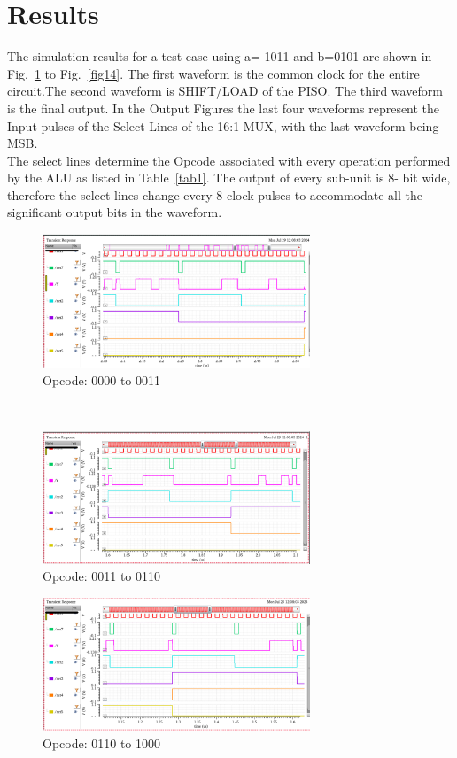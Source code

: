 \documentclass[conference]{IEEEtran}
\begin{document}
\section{Results}\label{E}
The simulation results for a test case using  a=  1011 and b=0101 are shown in Fig.~\ref{fig10} to Fig.~\ref{fig14}. The first waveform is the common clock for the entire circuit.The second waveform is SHIFT/LOAD of the PISO. The third waveform is the final output. In the Output Figures the last four waveforms represent the Input pulses of the Select Lines of the 16:1 MUX, with the last waveform being MSB.\\
The select lines determine the Opcode associated with every operation performed by the ALU as listed in Table~\ref{tab1}. The output of every sub-unit is 8- bit wide, therefore the select lines change every 8 clock pulses to accommodate all the significant output bits in the waveform.
\begin{figure}[htbp]
\centerline{\includegraphics[width=8cm,keepaspectratio,]{"Opcode_0000_0011.png"}}
\caption{Opcode: 0000 to 0011 }
\label{fig10}
\end{figure}\\ 
\begin{figure}[htbp]
\centerline{\includegraphics[width=8cm,keepaspectratio,]{"Opcode_0011_0110.png"}}
\caption{Opcode: 0011 to 0110}
\label{fig11}
\end{figure}
\begin{figure}[htbp]
\centerline{\includegraphics[width=8cm,keepaspectratio,]{"Opcode_0110_1000.png"}}
\caption{Opcode: 0110 to 1000}
\label{fig12}
\end{figure} 
\end{document}

